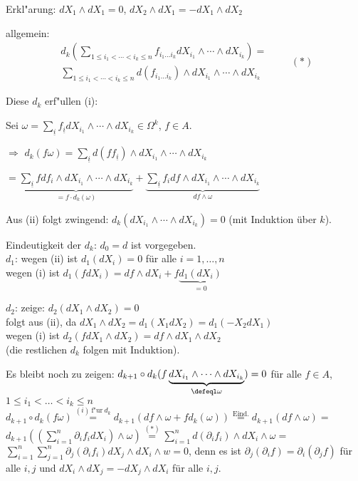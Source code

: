 \begin{SatzDef}
\begin{Bew}
Erkl"arung: $dX_1 \wedge dX_1 = 0$, $dX_2 \wedge dX_1 = - dX_1 \wedge dX_2$

allgemein:
\begin{equation*}
\begin{split}
 d_k(\displaystyle\sum_{1 \leq i_1 < \cdots < i_k \leq n} f_{i_1 \ldots i_k}
dX_{i_1} \wedge \cdots \wedge dX_{i_k}) =\\
\sum_{1 \leq i_1 < \cdots < i_k \leq n} d(f_{i_1 \ldots i_k}) \wedge dX_{i_1}
\wedge \cdots \wedge dX_{i_k} 
\end{split}
\qquad (\ast)
\end{equation*}

Diese $d_k$ erf"ullen (i):

Sei $\omega = \sum_{\underline{i}} f_{\underline{i}} dX_{i_1} \wedge \cdots \wedge dX_{i_k} \in \Omega^k$, $f \in A$.

$\Rightarrow$ $d_k(f \omega) = \sum_{\underline{i}} d(f f_{\underline{i}}) \wedge dX_{i_1} \wedge \cdots \wedge dX_{i_k}$

$= \underbrace{ \sum_{\underline{i}} f df_i \wedge dX_{i_1} \wedge \cdots \wedge dX_{i_k} }_{= f \cdot d_k(\omega)} + \underbrace{ \sum_{\underline{i}} f_i df \wedge dX_{i_1} \wedge \cdots \wedge dX_{i_k} }_{d f \wedge \omega}$

Aus (ii) folgt zwingend: $d_k(dX_{i_1}\wedge \cdots \wedge dX_{i_k}) = 0$ (mit 
Induktion \"uber $k$).

Eindeutigkeit der $d_k$: $d_0=d$ ist vorgegeben.\\
$d_1$: wegen (ii) ist $d_1(dX_i)=0$ f\"ur alle $i=1, \ldots, n$\\
wegen (i) ist $d_1(fdX_i)=df\wedge dX_i+f\underbrace{d_1(dX_i)}_{=0}$

$d_2$: zeige: $d_2(dX_1\wedge dX_2)=0$\\
folgt aus (ii), da $dX_1\wedge dX_2=d_1(X_1 dX_2)=d_1(-X_2dX_1)$\\
wegen (i) ist $d_2(fdX_1\wedge dX_2)=df\wedge dX_1\wedge dX_2$\\
(die restlichen $d_k$ folgen mit Induktion).

Es bleibt noch zu zeigen: $d_{k+1}\circ d_k(f\underbrace{dX_{i_1}\wedge \cdots
\wedge
dX_{i_k}}_{\defeql \omega})=0$ f\"ur alle $f\in A$, $1\leq i_1<\dots<i_k\leq n$\\
$d_{k+1}\circ d_k(f\omega)
\stackrel{(i)\ \text{f"ur}\ d_k}{=}d_{k+1}(df\wedge \omega +fd_k(\omega))
\stackrel{\text{Eind.}}{=}d_{k+1}(df\wedge \omega) 
=$\\
$d_{k+1}\left(\left(\sum_{i=1}^{n}\partial_i f_i dX_i\right)\wedge
\omega\right)
\stackrel{(\ast)}{=}\sum_{i=1}^{n}d(\partial_if_i)\wedge dX_i\wedge \omega=$\\
$\sum_{i=1}^n \sum_{j=1}^n \partial_j (\partial_i f_i)dX_j\wedge dX_{i}\wedge w=0$,
denn es ist $\partial_j(\partial_i f) = \partial_i(\partial_j f)$ f\"ur alle $i,j$
und $dX_i\wedge dX_j=-dX_j\wedge dX_i$ f\"ur alle $i,j$.


\end{Bew}
\end{SatzDef}
